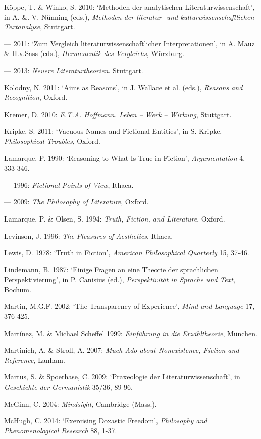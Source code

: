 \begin{hangparas}{.5cm}{1}
K\"oppe, T. \& Winko, S. 2010: `Methoden der analytischen Literaturwissenschaft', in A. \&. V. N\"unning (eds.), \emph{Methoden der literatur- und kulturwissenschaftlichen Textanalyse}, Stuttgart.

--- 2011: `Zum Vergleich literaturwissenschaftlicher Interpretationen', in A. Mauz \& H.v.Sass (eds.), \emph{Hermeneutik des Vergleichs}, W\"urzburg.

--- 2013: \emph{Neuere Literaturtheorien}. Stuttgart.

Kolodny, N. 2011: `Aims as Reasons', in J. Wallace et al. (eds.), \emph{Reasons and Recognition}, Oxford.

Kremer, D. 2010: \emph{E.T.A. Hoffmann. Leben -- Werk -- Wirkung}, Stuttgart.

Kripke, S. 2011: `Vacuous Names and Fictional Entities', in S. Kripke, \emph{Philosophical Troubles}, Oxford.

Lamarque, P. 1990: `Reasoning to What Is True in Fiction', \emph{Argumentation} 4, 333-346.

--- 1996: \emph{Fictional Points of View}, Ithaca. 

--- 2009: \emph{The Philosophy of Literature}, Oxford. 

Lamarque, P. \& Olsen, S. 1994: \emph{Truth, Fiction, and Literature}, Oxford.

Levinson, J. 1996: \emph{The Pleasures of Aesthetics}, Ithaca.

Lewis, D. 1978: `Truth in Fiction', \emph{American Philosophical Quarterly} 15, 37-46.

Lindemann, B. 1987: `Einige Fragen an eine Theorie der sprachlichen Perspektivierung', in P. Canisius (ed.), \emph{Perspektivit\"at in Sprache und Text}, Bochum.

Martin, M.G.F. 2002: `The Transparency of Experience', \emph{Mind and Language} 17, 376-425.

Mart\'inez, M. \& Michael Scheffel 1999: \emph{Einf\"uhrung in die Erz\"ahltheorie}, M\"unchen.

Martinich, A. \& Stroll, A. 2007: \emph{Much Ado about Nonexistence, Fiction and Reference}, Lanham.

Martus, S. \& Spoerhase, C. 2009: `Praxeologie der Literaturwissenschaft', in \emph{Geschichte der Germanistik} 35/36, 89-96.

McGinn, C. 2004: \emph{Mindsight}, Cambridge (Mass.).

McHugh, C. 2014: `Exercising Doxastic Freedom', \emph{Philosophy and Phenomenological Research} 88, 1-37.


\end{hangparas}
